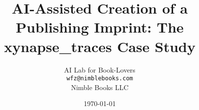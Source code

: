 
\usepackage[utf8]{inputenc}
\usepackage[T1]{fontenc}
\usepackage{lmodern}
\usepackage{microtype}

\usepackage[letterpaper,margin=1in]{geometry}
\usepackage{setspace}

\usepackage{amsmath,amssymb,amsthm}
\usepackage{mathtools}

\usepackage{graphicx}
\usepackage{float}
\usepackage{subcaption}
\usepackage{tikz}
\usetikzlibrary{shapes,arrows,positioning}

\usepackage{booktabs}
\usepackage{array}
\usepackage{tabularx}
\usepackage{longtable}

\usepackage{listings}
\usepackage{xcolor}



\lstset{style=pythonstyle}

\usepackage[colorlinks=true,linkcolor=blue,citecolor=blue,urlcolor=blue]{hyperref}
\usepackage{bookmark}

\usepackage{natbib}


\newcommand{\code}[1]{\texttt{#1}}
\newcommand{\file}[1]{\texttt{#1}}
\newcommand{\package}[1]{\texttt{#1}}

\theoremstyle{definition}
\newtheorem{definition}{Definition}
\newtheorem{example}{Example}

\theoremstyle{plain}
\newtheorem{theorem}{Theorem}
\newtheorem{lemma}{Lemma}
\newtheorem{proposition}{Proposition}

\theoremstyle{remark}
\newtheorem{remark}{Remark}
\newtheorem{note}{Note}

\title{AI-Assisted Creation of a Publishing Imprint: The xynapse\_traces Case Study}
\author{AI Lab for Book-Lovers\\
\texttt{wfz@nimblebooks.com}\\
Nimble Books LLC}
\date{\today}
